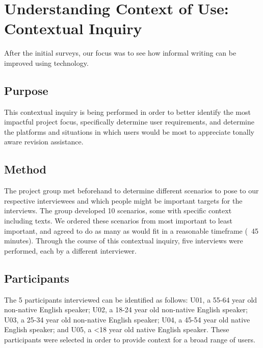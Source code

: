 \documentclass[acmsmall,screen,authorversion,nonacm]{acmart}
\begin{document}


\section{Understanding Context of Use: Contextual Inquiry}

After the initial surveys, our focus was to see how informal writing can be improved using technology.

\subsection{Purpose}
This contextual inquiry is being performed in order to better identify the most impactful project focus, specifically determine user requirements, and determine the platforms and situations in which users would be most to appreciate tonally aware revision assistance.

\subsection{Method}
The project group met beforehand to determine different scenarios to pose to our respective interviewees and which people might be important targets for the interviews. The group developed 10 scenarios, some with specific context including texts. We ordered these scenarios from most important to least important, and agreed to do as many as would fit in a reasonable timeframe (~45 minutes). Through the course of this contextual inquiry, five interviews were performed, each by a different interviewer.

\subsection{Participants}

The 5 participants interviewed can be identified as follows: U01, a 55-64 year old non-native English speaker; U02, a 18-24 year old non-native English speaker; U03, a 25-34 year old non-native English speaker; U04, a 45-54 year old native English speaker; and U05, a <18 year old native English speaker. These participants were selected in order to provide context for a broad range of users.
\end{document}
